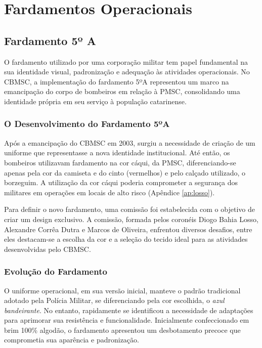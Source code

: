 \chapter{Fardamentos Operacionais}

\section{Fardamento 5º A}

O fardamento utilizado por uma corporação militar tem papel fundamental na sua identidade visual, 
padronização e adequação às atividades operacionais. No \acrfull{CBMSC}, a implementação do 
fardamento 5ºA representou um marco na emancipação do corpo de bombeiros em relação à \acrfull{PMSC}, 
consolidando uma identidade própria em seu serviço à população catarinense.

\subsection{O Desenvolvimento do Fardamento 5ºA}

Após a emancipação do \acrshort{CBMSC} em 2003, surgiu a necessidade de criação de um uniforme que 
representasse a nova identidade institucional. Até então, os bombeiros utilizavam fardamento na 
cor cáqui, da \acrshort{PMSC}, diferenciando-se apenas pela cor da camiseta e do cinto (vermelhos) 
e pelo calçado utilizado, o borzeguim. A utilização da cor cáqui poderia comprometer a segurança dos
 militares em operações em locais de alto risco (Apêndice \ref{ap:losso}).

Para definir o novo fardamento, uma comissão foi estabelecida com o objetivo de criar um design 
exclusivo. A comissão, formada pelos coronéis Diogo Bahia Losso, Alexandre Corrêa Dutra e Marcos
 de Oliveira, enfrentou diversos desafios, entre eles destacam-se a escolha da cor e a seleção 
 do tecido ideal para as atividades desenvolvidas pelo \acrshort{CBMSC}.

 \begin{centering}
\end{centering}

\subsection{Evolução do Fardamento}

O uniforme operacional, em sua versão inicial, manteve o padrão tradicional adotado pela Polícia 
Militar, se diferenciando pela cor escolhida, o \textit{azul bandeirante}. No entanto, rapidamente 
se identificou a necessidade de adaptações para aprimorar sua resistência e funcionalidade. 
Inicialmente confeccionado em brim 100\% algodão, o fardamento apresentou um desbotamento precoce
 que comprometia sua aparência e padronização.

